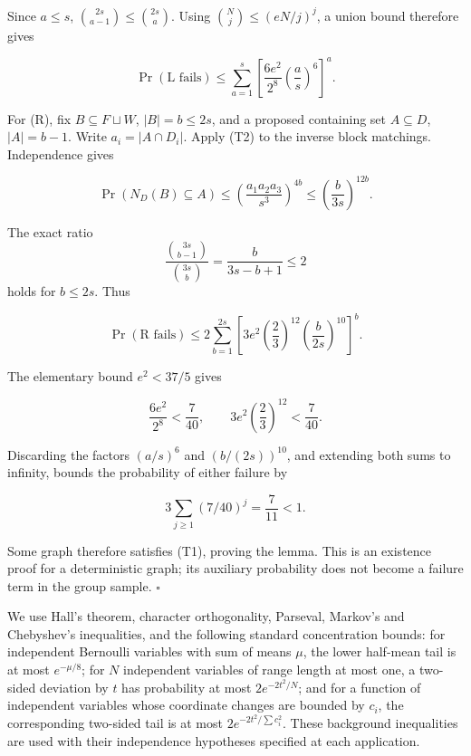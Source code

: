 \documentclass[11pt,a4paper]{article}
\begin{document}
Since \(a\le s\), \(\binom{2s}{a-1}\le \binom{2s}{a}\). Using \(\binom{N}{j}\le (eN/j)^j\), a union bound therefore gives

\begin{equation}
\Pr(\text{L fails})
\le\sum_{a=1}^{s}
\left[\frac{6e^2}{2^8}\left(\frac as\right)^6\right]^a.
\tag{T3}\label{eq:T3}
\end{equation}

For (R), fix \(B\subseteq F\sqcup W\), \(|B|=b\le 2s\), and a proposed containing set \(A\subseteq D\), \(|A|=b-1\). Write \(a_i=|A\cap D_i|\). Apply (T2) to the inverse block matchings. Independence gives

\[
\Pr(N_D(B)\subseteq A)
\le\left(\frac{a_1a_2a_3}{s^3}\right)^{4b}
\le\left(\frac{b}{3s}\right)^{12b}.
\]

The exact ratio \[
\frac{\binom{3s}{b-1}}{\binom{3s}b}
=\frac b{3s-b+1}\le2
\] holds for \(b\le 2s\). Thus

\begin{equation}
\Pr(\text{R fails})
\le2\sum_{b=1}^{2s}
\left[3e^2\left(\frac23\right)^{12}
       \left(\frac b{2s}\right)^{10}\right]^b.
\tag{T4}\label{eq:T4}
\end{equation}

The elementary bound \(e^{2}<37/5\) gives

\[
\frac{6e^2}{2^8}<\frac7{40},\qquad
3e^2\left(\frac23\right)^{12}<\frac7{40}.
\]

Discarding the factors \((a/s)^{6}\) and \((b/(2s))^{10}\), and extending both sums to infinity, bounds the probability of either failure by

\begin{equation}
3\sum_{j\ge1}(7/40)^j=\frac7{11}<1.
\tag{T5}\label{eq:T5}
\end{equation}

Some graph therefore satisfies (T1), proving the lemma. This is an existence proof for a deterministic graph; its auxiliary probability does not become a failure term in the group sample. \(\square\)

We use Hall's theorem, character orthogonality, Parseval, Markov's and Chebyshev's inequalities, and the following standard concentration bounds: for independent Bernoulli variables with sum of means \(\mu\), the lower half-mean tail is at most \(e^{-\mu/8}\); for \(N\) independent variables of range length at most one, a two-sided deviation by \(t\) has probability at most \(2e^{-2t^2/N}\); and for a function of independent variables whose coordinate changes are bounded by \(c_i\), the corresponding two-sided tail is at most \(2e^{-2t^2/\sum c_i^2}\). These background inequalities are used with their independence hypotheses specified at each application.
\end{document}

